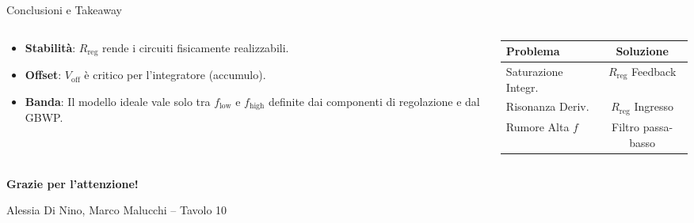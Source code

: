 \documentclass[aspectratio=169]{beamer}
\begin{document}
\begin{frame}{Conclusioni e Takeaway}
    \begin{columns}[c]
        \begin{column}{0.6\textwidth}
            \begin{itemize}
                \item \textbf{Stabilità}: $R_{\text{reg}}$ rende i circuiti fisicamente realizzabili.
                \item \textbf{Offset}: $V_{\text{off}}$ è critico per l'integratore (accumulo).
                \item \textbf{Banda}: Il modello ideale vale solo tra $f_{\text{low}}$ e $f_{\text{high}}$ definite dai componenti di regolazione e dal GBWP.
            \end{itemize}
        \end{column}
        \begin{column}{0.35\textwidth}
            \centering
            \begin{table}
                \scriptsize
                \begin{tabular}{|l|c|}
                    \hline
                    \rowcolor{TDlight} \textbf{Problema} & \textbf{Soluzione} \\ \hline
                    Saturazione Integr. & $R_{\text{reg}}$ Feedback \\ \hline
                    Risonanza Deriv. & $R_{\text{reg}}$ Ingresso \\ \hline
                    Rumore Alta $f$ & Filtro passa-basso \\ \hline
                \end{tabular}
            \end{table}
        \end{column}
    \end{columns}
\end{frame}

\begin{frame}[plain]
    \centering
    \vspace{2cm}
    {\color{TDblue}\Huge \textbf{Grazie per l'attenzione!}}
    \vspace{1cm}
    \par Alessia Di Nino, Marco Malucchi -- Tavolo 10
\end{frame}
\end{document}
